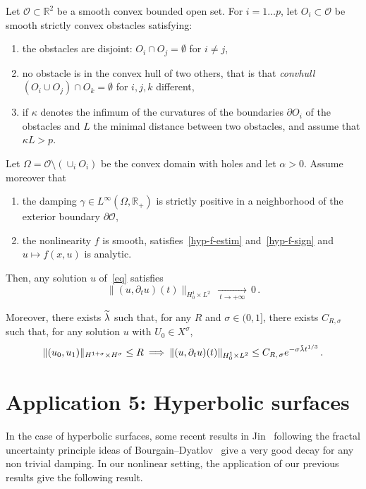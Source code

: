 \documentclass[AHL,Unicode,longabstracts]{cedram}
\newcommand{\RR}{\mathbb{R}}
\newcommand{\Oc}{\mathcal{O}}
\newcommand*{\alphenumi}{\renewcommand*{\theenumi}{\alph{enumi}}}
\let\oldtilde\tilde
\renewcommand*{\tilde}[1]{\mathchoice{\widetilde{#1}}{\widetilde{#1}}{\oldtilde{#1}}{\oldtilde{#1}}}\let\oldexists\exists
\renewcommand*{\exists}{\mathrel{\oldexists}}
\begin{document}
\begin{theo}\label{th-appli4}
Let $\Oc\subset\RR^2$ be a smooth convex bounded open set. For $i=1\ldots p$, let $O_i\subset \Oc$ be smooth strictly convex obstacles satisfying:
\begin{enumerate}\alphenumi
\item \label{listtheo11.1.1}the obstacles are disjoint: $O_i\cap O_j=\emptyset$ for $i\neq j$,
\item \label{listtheo11.1.2}no obstacle is in the convex hull of two others, that is that \emph{ convhull}$(O_i\cup O_j)\cap O_k =\emptyset$ for $i,j,k$ different,
\item \label{listtheo11.1.3}if $\kappa$ denotes the infimum of the curvatures of the boundaries $\partial O_i$ of the obstacles and $L$ the minimal distance between two obstacles, and assume that $\kappa L>p$.
\end{enumerate}
Let $\Omega=\Oc\setminus (\cup_i O_i)$ be the convex domain with holes and let $\alpha>0$. Assume moreover that
\setcounter{enumi}{3}
\begin{enumerate}\alphenumi
\item \label{listtheo11.1.4}the damping $\gamma\in L^\infty(\Omega,\RR_+)$ is strictly positive in a neighborhood of the exterior boundary $\partial \Oc$,
\item \label{listtheo11.1.5}the nonlinearity $f$ is smooth, satisfies~\eqref{hyp-f-estim} and~\eqref{hyp-f-sign} and $u\mapsto f(x,u)$ is analytic.
\end{enumerate}

Then, any solution $u$ of~\eqref{eq} satisfies
\[
\|(u,\partial_t u)(t)\|_{H^1_0\times L^2}\,\xrightarrow[\:t\longrightarrow
+\infty\:]{}\,0\,.
\]

Moreover, there exists $\tilde\lambda$ such that, for any $R$ and $\sigma\in (0,1]$, there exists $C_{R,\sigma}$ such that, for any solution $u$ with $U_0\in X^\sigma$,
\[
\|(u_0,u_1)\|_{H^{1+\sigma}\times H^\sigma}\leq
R\:\Longrightarrow\:\|(u,\partial_t u)(t)\|_{H^1_0\times L^2} \leq
C_{R,\,\sigma}e^{-\sigma\tilde \lambda{t}^{1/3}}\,.
\]
\end{theo}



\section{Application 5: Hyperbolic surfaces}\label{section-hyperbo}
In the case of hyperbolic surfaces, some recent results in Jin~\cite{Lin} following the fractal uncertainty principle ideas of Bourgain--Dyatlov~\cite{BourgainDyatlov} give a very good decay for any non trivial damping. In our nonlinear setting, the application of our previous results give the following result.
\end{document}
